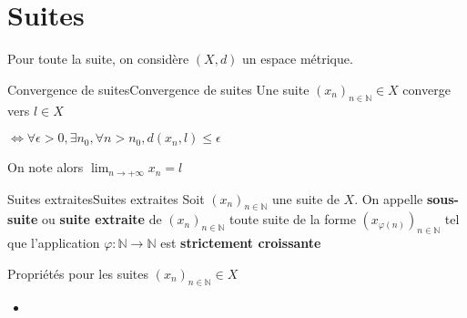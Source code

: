 \section{Suites}
Pour toute la suite, on considère $(X,d)$ un espace métrique.
\begin{definition}{Convergence de suites}{Convergence de suites}
        Une suite $(x_{n})_{n \in \mathbb{N}} \in X$ converge vers $l \in X$  \newline
                                        
        \noindent $\Longleftrightarrow \forall \epsilon > 0, \exists n_{0}, \forall n > n_{0}, d(x_{n},l) \le \epsilon $
\end{definition}
On note alors $\lim_{n \longrightarrow +\infty} x_{n} = l$
\begin{definition}{Suites extraites}{Suites extraites}
    Soit $(x_{n})_{n \in \mathbb{N}}$ une suite de $X$. On appelle \textbf{sous-suite} ou \textbf{suite extraite} de $(x_{n})_{n \in \mathbb{N}}$ toute suite de la forme $(x_{\varphi (n)})_{n \in \mathbb{N}}$ tel que l'application $\varphi : \mathbb{N} \longrightarrow \mathbb{N}$ est \textbf{strictement croissante} 
\end{definition}
\newpage
Propriétés pour les suites $(x_{n})_{n \in \mathbb{N}} \in X$ \newline
\begin{itemize}
    \item 
\end{itemize}